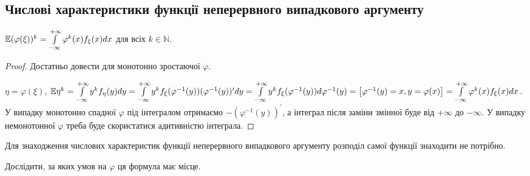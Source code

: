 \subsection{Числові характеристики функції неперервного випадкового аргументу}
\begin{proposition*}
    $\mathbb{E} (\varphi(\xi))^k = \int\limits_{-\infty}^{+\infty} \varphi^k(x) f_\xi(x) dx$ для всіх $k \in \mathbb{N}$.
\end{proposition*}
\begin{proof}
    Достатньо довести для монотонно зростаючої $\varphi$.

    \noindent$\eta = \varphi(\xi)$, $\mathbb{E}\eta^k = \int\limits_{-\infty}^{+\infty} y^k f_\eta(y) dy = \int\limits_{-\infty}^{+\infty} y^k f_\xi (\varphi^{-1} (y)) (\varphi^{-1} (y))^\prime dy =
    \int\limits_{-\infty}^{+\infty} y^k f_\xi(\varphi^{-1} (y)) d \varphi^{-1} (y) = \left[ \varphi^{-1} (y) = x, y = \varphi(x)\right] = \int\limits_{-\infty}^{+\infty} \varphi^k(x) f_\xi(x) dx$.
    У випадку монотонно спадної $\varphi$ під інтегралом отримаємо $-(\varphi^{-1} (y))^\prime$, а інтеграл після заміни змінної буде від $+\infty$ до $-\infty$.
    У випадку немонотонної $\varphi$ треба буде скористатися адитивністю інтеграла.
\end{proof}

\begin{remark}
    Для знаходження числових характеристик функції неперервного випадкового аргументу розподіл самої функції знаходити не потрібно.
\end{remark}

\begin{exercise}
    Дослідити, за яких умов на $\varphi$ ця формула має місце.
\end{exercise}